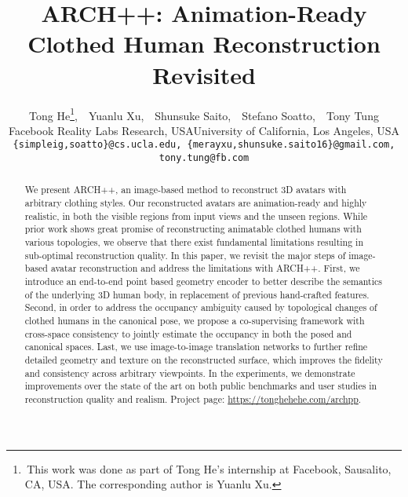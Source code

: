\documentclass[10pt,twocolumn,letterpaper]{article}
\begin{document}
\title{
ARCH++: Animation-Ready Clothed Human Reconstruction Revisited
}

\author{Tong He\thanks{\,This work was done as part of Tong He's internship at Facebook, Sausalito, CA, USA. The corresponding author is Yuanlu Xu.},\ \ Yuanlu Xu,\ \ Shunsuke Saito,\ \ Stefano Soatto,\ \ Tony Tung\\
Facebook Reality Labs Research, USA\quad\quad University of California, Los Angeles, USA\\
{\tt \small \{simpleig,soatto\}@cs.ucla.edu, \{merayxu,shunsuke.saito16\}@gmail.com, tony.tung@fb.com}
}

\maketitle
\ificcvfinal\thispagestyle{empty}\fi

\begin{abstract}
\vspace{-2mm}

We present ARCH++, an image-based method to reconstruct 3D avatars with arbitrary clothing styles. Our reconstructed avatars are animation-ready and highly realistic, in both the visible regions from input views and the unseen regions. While prior work shows great promise of reconstructing animatable clothed humans with various topologies, we observe that there exist fundamental limitations resulting in sub-optimal reconstruction quality. In this paper, we revisit the major steps of image-based avatar reconstruction and address the limitations with ARCH++. First, we introduce an end-to-end point based geometry encoder to better describe the semantics of the underlying 3D human body, in replacement of previous hand-crafted features. Second, in order to address the occupancy ambiguity caused by topological changes of clothed humans in the canonical pose, we propose a co-supervising framework with cross-space consistency to jointly estimate the occupancy in both the posed and canonical spaces. Last, we use image-to-image translation networks to further refine detailed geometry and texture on the reconstructed surface, which improves the fidelity and consistency across arbitrary viewpoints. In the experiments, we demonstrate improvements over the state of the art on both public benchmarks and user studies in reconstruction quality and realism. Project page: \url{https://tonghehehe.com/archpp}.

\vspace{-1mm}
\end{abstract}
\end{document}
